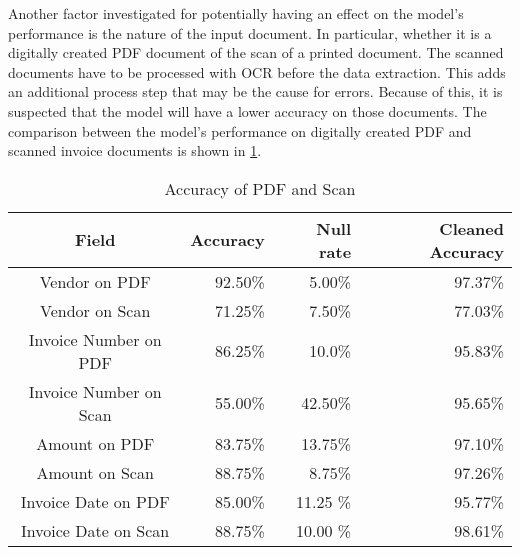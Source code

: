 Another factor investigated for potentially having an effect on the model's performance is the nature of the input document. In particular, whether it is a digitally created PDF document of the scan of a printed document. The scanned documents have to be processed with \ac{OCR} before the data extraction. This adds an additional process step that may be the cause for errors. Because of this, it is suspected that the model will have a lower accuracy on those documents. The comparison between the model's performance on digitally created PDF and scanned invoice documents is shown in \cref{table:Field_Com_Scan_PDF}.

\begin{table}[ht]   %
    \centering
    \footnotesize
    \begin{tabular}{c|rrr} %
        \toprule    %
        Field  & Accuracy  & Null rate & Cleaned Accuracy \\
        \midrule    %
        Vendor on PDF    & 92.50\%   &  5.00\%   & 97.37\% \\
        Vendor on Scan   & 71.25\%   &  7.50\%   & 77.03\% \\
        \midrule    %
        Invoice Number on PDF & 86.25\%   & 10.0\%  & 95.83\%\\
        Invoice Number on Scan & 55.00\%  & 42.50\%  & 95.65\%\\
        \midrule    %
        Amount on PDF      & 83.75\%   & 13.75\%  & 97.10\% \\
        Amount on Scan     & 88.75\%   & 8.75\%  & 97.26\% \\
        \midrule    %
        Invoice Date on PDF  & 85.00\%   & 11.25 \%  & 95.77\% \\
        Invoice Date on Scan & 88.75\%   & 10.00 \%  & 98.61\% \\
        
        \bottomrule %
    \end{tabular}
    \caption{Accuracy of PDF and Scan}
    \label{table:Field_Com_Scan_PDF}
\end{table}

